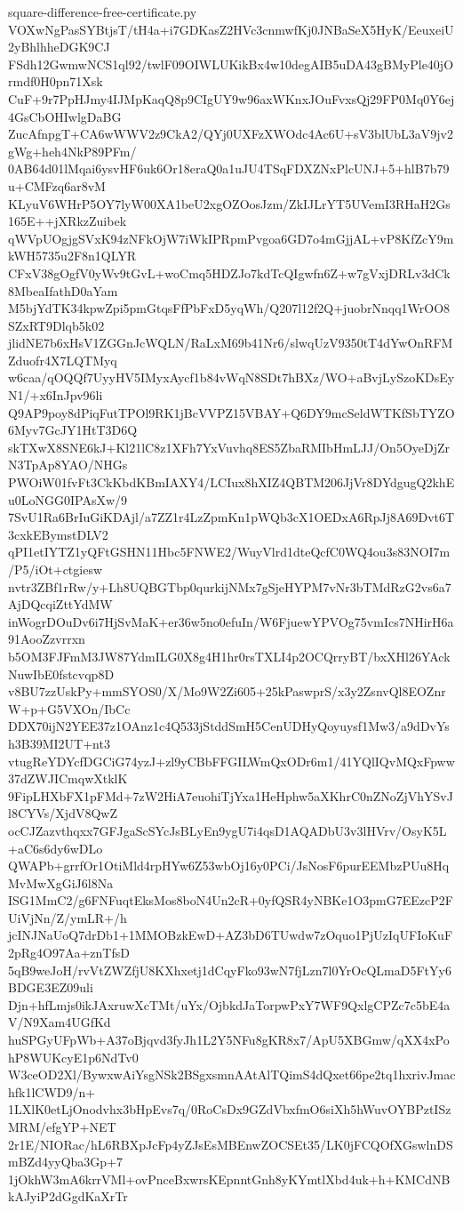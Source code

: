 \documentclass[11pt]{article}
\theoremstyle{definition}
\theoremstyle{remark}
\begin{document}
\begin{filecontents*}[overwrite]{square-difference-free-certificate.py}
VOXwNgPasSYBtjsT/tH4a+i7GDKasZ2HVc3cnmwfKj0JNBaSeX5HyK/EeuxeiU2yBhlhheDGK9CJ
FSdh12GwmwNCS1ql92/twlF09OIWLUKikBx4w10degAIB5uDA43gBMyPle40jOrmdf0H0pn71Xsk
CuF+9r7PpHJmy4IJMpKaqQ8p9CIgUY9w96axWKnxJOuFvxsQj29FP0Mq0Y6ej4GsCbOHIwlgDaBG
ZucAfnpgT+CA6wWWV2z9CkA2/QYj0UXFzXWOdc4Ac6U+sV3blUbL3aV9jv2gWg+heh4NkP89PFm/
0AB64d01lMqai6ysvHF6uk6Or18eraQ0a1uJU4TSqFDXZNxPlcUNJ+5+hlB7b79u+CMFzq6ar8vM
KLyuV6WHrP5OY7lyW00XA1beU2xgOZOosJzm/ZkIJLrYT5UVemI3RHaH2Gs165E++jXRkzZuibek
qWVpUOgjgSVxK94zNFkOjW7iWkIPRpmPvgoa6GD7o4mGjjAL+vP8KfZcY9mkWH5735u2F8n1QLYR
CFxV38gOgfV0yWv9tGvL+woCmq5HDZJo7kdTcQIgwfn6Z+w7gVxjDRLv3dCk8MbeaIfathD0aYam
M5bjYdTK34kpwZpi5pmGtqsFfPbFxD5yqWh/Q207l12f2Q+juobrNnqq1WrOO8SZxRT9Dlqb5k02
jlidNE7b6xHsV1ZGGnJcWQLN/RaLxM69b41Nr6/slwqUzV9350tT4dYwOnRFMZduofr4X7LQTMyq
w6caa/qOQQf7UyyHV5IMyxAycf1b84vWqN8SDt7hBXz/WO+aBvjLySzoKDsEyN1/+x6InJpv96li
Q9AP9poy8dPiqFutTPOl9RK1jBcVVPZ15VBAY+Q6DY9mcSeldWTKfSbTYZO6Myv7GcJY1HtT3D6Q
skTXwX8SNE6kJ+Kl21lC8z1XFh7YxVuvhq8ES5ZbaRMIbHmLJJ/On5OyeDjZrN3TpAp8YAO/NHGs
PWOiW01fvFt3CkKbdKBmIAXY4/LCIux8hXIZ4QBTM206JjVr8DYdgugQ2khEu0LoNGG0IPAsXw/9
7SvU1Ra6BrIuGiKDAjl/a7ZZ1r4LzZpmKn1pWQb3cX1OEDxA6RpJj8A69Dvt6T3cxkEBymstDLV2
qPI1etIYTZ1yQFtGSHN11Hbc5FNWE2/WuyVlrd1dteQcfC0WQ4ou3s83NOI7m/P5/iOt+ctgiesw
nvtr3ZBf1rRw/y+Lh8UQBGTbp0qurkijNMx7gSjeHYPM7vNr3bTMdRzG2vs6a7AjDQcqiZttYdMW
inWogrDOuDv6i7HjSvMaK+er36w5no0efuIn/W6FjuewYPVOg75vmIcs7NHirH6a91AooZzvrrxn
b5OM3FJFmM3JW87YdmILG0X8g4H1hr0rsTXLI4p2OCQrryBT/bxXHl26YAckNuwIbE0fstcvqp8D
v8BU7zzUskPy+mmSYOS0/X/Mo9W2Zi605+25kPaswprS/x3y2ZsnvQl8EOZnrW+p+G5VXOn/IbCc
DDX70ijN2YEE37z1OAnz1c4Q533jStddSmH5CenUDHyQoyuysf1Mw3/a9dDvYsh3B39MI2UT+nt3
vtugReYDYcfDGCiG74yzJ+zl9yCBbFFGILWmQxODr6m1/41YQlIQvMQxFpww37dZWJICmqwXtklK
9FipLHXbFX1pFMd+7zW2HiA7euohiTjYxa1HeHphw5aXKhrC0nZNoZjVhYSvJl8CYVs/XjdV8QwZ
ocCJZazvthqxx7GFJgaScSYcJsBLyEn9ygU7i4qsD1AQADbU3v3lHVrv/OsyK5L+aC6s6dy6wDLo
QWAPb+grrfOr1OtiMld4rpHYw6Z53wbOj16y0PCi/JsNosF6purEEMbzPUu8HqMvMwXgGiJ6l8Na
ISG1MmC2/g6FNFuqtEksMos8boN4Un2cR+0yfQSR4yNBKe1O3pmG7EEzcP2FUiVjNn/Z/ymLR+/h
jcINJNaUoQ7drDb1+1MMOBzkEwD+AZ3bD6TUwdw7zOquo1PjUzIqUFIoKuF2pRg4O97Aa+znTfsD
5qB9weJoH/rvVtZWZfjU8KXhxetj1dCqyFko93wN7fjLzn7l0YrOcQLmaD5FtYy6BDGE3EZ09uli
Djn+hfLmjs0ikJAxruwXcTMt/uYx/OjbkdJaTorpwPxY7WF9QxlgCPZc7c5bE4aV/N9Xam4UGfKd
huSPGyUFpWb+A37oBjqvd3fyJh1L2Y5NFu8gKR8x7/ApU5XBGmw/qXX4xPohP8WUKcyE1p6NdTv0
W3ceOD2Xl/BywxwAiYsgNSk2BSgxsmnAAtAlTQimS4dQxet66pe2tq1hxrivJmachfk1lCWD9/n+
1LXlK0etLjOnodvhx3bHpEvs7q/0RoCsDx9GZdVbxfmO6siXh5hWuvOYBPztISzMRM/efgYP+NET
2r1E/NIORac/hL6RBXpJcFp4yZJsEsMBEnwZOCSEt35/LK0jFCQOfXGswlnDSmBZd4yyQba3Gp+7
1jOkhW3mA6krrVMl+ovPnceBxwrsKEpnntGnh8yKYmtlXbd4uk+h+KMCdNBkAJyiP2dGgdKaXrTr

\end{filecontents*}
\end{document}
